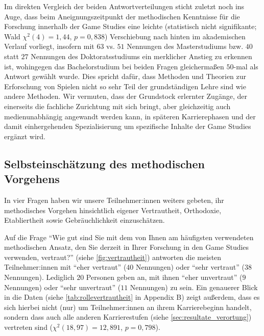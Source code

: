 \documentclass{scrartcl}
\begin{document}
Im direkten Vergleich der beiden Antwortverteilungen sticht zuletzt noch ins Auge, dass beim Aneignungszeitpunkt der methodischen Kenntnisse für die Forschung innerhalb der Game Studies eine leichte (statistisch nicht signifikante; Wald $\chi^{2}(4) = 1,44$, $p = 0,838$) Verschiebung nach hinten im akademischen Verlauf vorliegt, insofern mit $63$ vs. $51$ Nennungen des Masterstudiums bzw. $40$ statt $27$ Nennungen des Doktoratsstudiums ein merklicher Anstieg zu erkennen ist, wohingegen das Bachelorstudium bei beiden Fragen gleichermaßen $50$-mal als Antwort gewählt wurde.
Dies spricht dafür, dass Methoden und Theorien zur Erforschung von Spielen nicht so sehr Teil der grundständigen Lehre sind wie andere Methoden.
Wir vermuten, dass der Grundstock erlernter Zugänge, der einerseits die fachliche Zurichtung mit sich bringt, aber gleichzeitig auch medienunabhängig angewandt werden kann, in späteren Karrierephasen und der damit einhergehenden Spezialisierung um spezifische Inhalte der Game Studies ergänzt wird.


\subsection{Selbsteinschätzung des methodischen Vorgehens}\label{sec:resultate_selbsteinschätzung}
In vier Fragen haben wir unsere Teilnehmer:innen weiters gebeten, ihr methodisches Vorgehen hinsichtlich eigener Vertrautheit, Orthodoxie, Etabliertheit sowie Gebräuchlichkeit einzuschätzen.

Auf die Frage \enquote{Wie gut sind Sie mit dem von Ihnen am häufigsten verwendeten methodischen Ansatz, den Sie derzeit in Ihrer Forschung in den Game Studies verwenden, vertraut?} (siehe \autoref{fig:vertrautheit}) antworten die meisten Teilnehmer:innen mit \enquote{eher vertraut} ($40$ Nennungen) oder \enquote{sehr vertraut} ($38$ Nennungen).
Lediglich $20$ Personen geben an, mit ihnen \enquote{eher unvertraut} ($9$ Nennungen) oder \enquote{sehr unvertraut} ($11$ Nennungen) zu sein.
Ein genauerer Blick in die Daten (siehe \autoref{tab:rollevertrautheit} in Appendix B) zeigt außerdem, dass es sich hierbei nicht (nur) um Teilnehmer:innen an ihrem Karrierebeginn handelt, sondern dass auch alle anderen Karrierestufen (siehe \autoref{sec:resultate_verortung}) vertreten sind ($\chi^{2}(18, 97) = 12,891$, $p = 0,798$).
\end{document}
